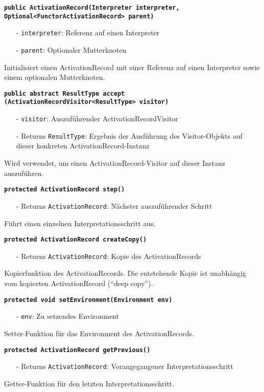 \documentclass[parskip=full,11pt,twoside]{scrartcl}
\begin{document}
\textbf{\texttt{public ActivationRecord(Interpreter interpreter,\\Optional<FunctorActivationRecord> parent)}}
\begin{itemize}[noitemsep]
	\item[-] \texttt{interpreter}: Referenz auf einen Interpreter
	\item[-] \texttt{parent}: Optionaler Mutterknoten
\end{itemize}
Initialisiert einen ActivationRecord mit einer Referenz auf einen Interpreter sowie einem optionalen Mutterknoten.

\textbf{\texttt{public abstract ResultType accept\\(ActivationRecordVisitor<ResultType> visitor)}}
\begin{itemize}[noitemsep]
	\item[-] \texttt{visitor}: Auszuführender ActivationRecordVisitor
	\item[-] Returns \texttt{ResultType}: Ergebnis der Ausführung des Visitor-Objekts auf dieser konkreten ActivationRecord-Instanz
\end{itemize}
Wird verwendet, um einen ActivationRecord-Visitor auf dieser Instanz auszuführen.

\textbf{\texttt{protected ActivationRecord step()}}
\begin{itemize}[noitemsep]
	\item[-] Returns \texttt{ActivationRecord}: Nächster auszuführender Schritt
\end{itemize}
Führt einen einzelnen Interpretationsschritt aus.

\textbf{\texttt{protected ActivationRecord createCopy()}}
\begin{itemize}[noitemsep]
	\item[-] Returns \texttt{ActivationRecord}: Kopie des ActivationRecords
\end{itemize}
Kopierfunktion des ActivationRecords. Die entstehende Kopie ist unabhängig vom kopierten ActivationRecord (\enquote{deep copy}).

\textbf{\texttt{protected void setEnvironment(Environment env)}}
\begin{itemize}[noitemsep]
	\item[-] \texttt{env}: Zu setzendes Environment
\end{itemize}
Setter-Funktion für das Environment des ActivationRecords.

\textbf{\texttt{protected ActivationRecord getPrevious()}}
\begin{itemize}[noitemsep]
	\item[-] Returns \texttt{ActivationRecord}: Vorangegangener Interpretationsschritt
\end{itemize}
Getter-Funktion für den letzten Interpretationsschritt.
\end{document}
